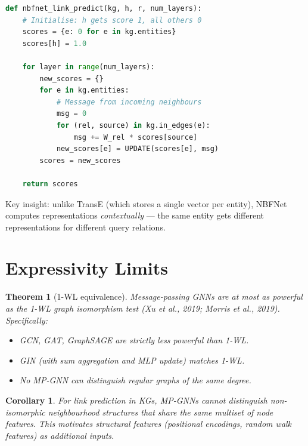 \documentclass[11pt,a4paper,oneside,openany]{book}
\theoremstyle{definition}
\theoremstyle{plain}
\newtheorem{theorem}{Theorem}[chapter]
\newtheorem{corollary}{Corollary}[chapter]
\theoremstyle{remark}
\begin{document}
\begin{algorithm}[h]
	\caption{NBFNet forward pass for link prediction}
	\label{alg:nbfnet}
	\begin{lstlisting}[language=Python,numbers=none]
def nbfnet_link_predict(kg, h, r, num_layers):
    # Initialise: h gets score 1, all others 0
    scores = {e: 0 for e in kg.entities}
    scores[h] = 1.0

    for layer in range(num_layers):
        new_scores = {}
        for e in kg.entities:
            # Message from incoming neighbours
            msg = 0
            for (rel, source) in kg.in_edges(e):
                msg += W_rel * scores[source]
            new_scores[e] = UPDATE(scores[e], msg)
        scores = new_scores

    return scores
\end{lstlisting}
\end{algorithm}

Key insight: unlike TransE (which stores a single vector per entity), NBFNet computes representations \emph{contextually} --- the same entity gets different representations for different query relations.

\section{Expressivity Limits}\label{sec:gnn-express}

\begin{theorem}[1-WL equivalence]
	Message-passing GNNs are at most as powerful as the 1-WL graph isomorphism test (Xu et al., 2019; Morris et al., 2019). Specifically:
	\begin{itemize}
		\item GCN, GAT, GraphSAGE are strictly less powerful than 1-WL.
		\item GIN (with sum aggregation and MLP update) matches 1-WL.
		\item No MP-GNN can distinguish regular graphs of the same degree.
	\end{itemize}
\end{theorem}

\begin{corollary}
	For link prediction in KGs, MP-GNNs cannot distinguish non-isomorphic neighbourhood structures that share the same multiset of node features. This motivates structural features (positional encodings, random walk features) as additional inputs.
\end{corollary}
\end{document}

